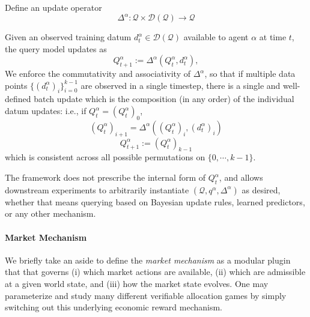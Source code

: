 Define an update operator
\[
\Delta^\alpha : \mathcal{Q}\times \mathcal{D}(\mathcal{Q}) \to \mathcal{Q}
\]

Given an observed training datum $d_t^\alpha\in\mathcal{D}(\mathcal{Q})$ available to agent $\alpha$ at time $t$, the query model updates as
\[
Q_{t+1}^\alpha :=\Delta^\alpha(Q_t^\alpha, d_t^\alpha),
\]
We enforce the commutativity and associativity of $\Delta^\alpha$, so that if multiple data points $\{(d_t^\alpha)_i\}_{i=0}^{k-1}$ are observed in a single timestep, there is a single and well-defined batch update which is the composition (in any order) of the individual datum updates: i.e., if $Q_t^\alpha=(Q_t^\alpha)_0$,  
\[
(Q_{t}^\alpha)_{i+1} = \Delta^\alpha((Q_t^\alpha)_i, (d_t^\alpha)_i)
\]
\[Q_{t+1}^\alpha := (Q_{t}^\alpha)_{k-1}\]
which is consistent across all possible permutations on $\{0,\cdots,k-1\}$.



The framework does not prescribe the internal form of $Q_t^\alpha$, and allows downstream experiments to arbitrarily instantiate $(\mathcal{Q}, q^\alpha, \Delta^\alpha)$ as desired, whether that means querying based on Bayesian update rules, learned predictors, or any other mechanism.

\paragraph{Market Mechanism}
\label{sec:vamp-market}

We briefly take an aside to define the \emph{market mechanism} as a modular plugin that that governs (i) which market actions are available, (ii) which are admissible at a given world state, and (iii) how the market state evolves. One may parameterize and study many different verifiable allocation games by simply switching out this underlying economic reward mechanism.

